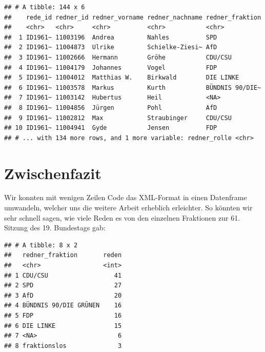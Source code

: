 \documentclass[oneside, 12pt]{scrbook}
\newenvironment{Shaded}{\begin{snugshade}}{\end{snugshade}}
\newcommand{\DataTypeTok}[1]{\textcolor[rgb]{0.13,0.29,0.53}{#1}}
\newcommand{\KeywordTok}[1]{\textcolor[rgb]{0.13,0.29,0.53}{\textbf{#1}}}
\newcommand{\NormalTok}[1]{#1}
\newcommand{\OperatorTok}[1]{\textcolor[rgb]{0.81,0.36,0.00}{\textbf{#1}}}
\newcommand{\StringTok}[1]{\textcolor[rgb]{0.31,0.60,0.02}{#1}}
\theoremstyle{definition}
\theoremstyle{definition}
\theoremstyle{definition}
\theoremstyle{remark}
\begin{document}
\begin{verbatim}
## # A tibble: 144 x 6
##    rede_id redner_id redner_vorname redner_nachname redner_fraktion
##    <chr>   <chr>     <chr>          <chr>           <chr>          
##  1 ID1961~ 11003196  Andrea         Nahles          SPD            
##  2 ID1961~ 11004873  Ulrike         Schielke-Ziesi~ AfD            
##  3 ID1961~ 11002666  Hermann        Gröhe           CDU/CSU        
##  4 ID1961~ 11004179  Johannes       Vogel           FDP            
##  5 ID1961~ 11004012  Matthias W.    Birkwald        DIE LINKE      
##  6 ID1961~ 11003578  Markus         Kurth           BÜNDNIS 90/DIE~
##  7 ID1961~ 11003142  Hubertus       Heil            <NA>           
##  8 ID1961~ 11004856  Jürgen         Pohl            AfD            
##  9 ID1961~ 11002812  Max            Straubinger     CDU/CSU        
## 10 ID1961~ 11004941  Gyde           Jensen          FDP            
## # ... with 134 more rows, and 1 more variable: redner_rolle <chr>
\end{verbatim}

\hypertarget{zwischenfazit}{%
\section{Zwischenfazit}\label{zwischenfazit}}

Wir konnten mit wenigen Zeilen Code das XML-Format in einen Datenframe
umwandeln, welcher uns die weitere Arbeit erheblich erleichter. So
könnten wir sehr schnell sagen, wie viele Reden es von den einzelnen
Fraktionen zur 61. Sitzung des 19. Bundestags gab:

\begin{Shaded}
\end{Shaded}

\begin{verbatim}
## # A tibble: 8 x 2
##   redner_fraktion       reden
##   <chr>                 <int>
## 1 CDU/CSU                  41
## 2 SPD                      27
## 3 AfD                      20
## 4 BÜNDNIS 90/DIE GRÜNEN    16
## 5 FDP                      16
## 6 DIE LINKE                15
## 7 <NA>                      6
## 8 fraktionslos              3
\end{verbatim}
\end{document}
